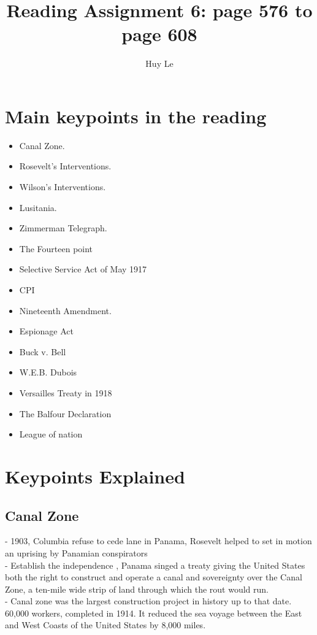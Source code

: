 \documentclass{article}
\begin{document}
\title{Reading Assignment 6: page 576 to page 608}
\author{Huy Le}

\maketitle

\section{Main keypoints in the reading}
\begin{itemize}
\item Canal Zone.
\item Rosevelt's Interventions.
\item Wilson's Interventions.
\item Lusitania.
\item Zimmerman Telegraph.
\item The Fourteen point
\item Selective Service Act of May 1917
\item CPI
\item Nineteenth Amendment.
\item Espionage Act
\item Buck v. Bell
\item W.E.B. Dubois
\item Versailles Treaty in 1918
\item The Balfour Declaration 
\item League of nation

\end{itemize}


\section{Keypoints Explained}
\subsection{ Canal Zone}
- 1903, Columbia refuse to cede lane in Panama, Rosevelt helped to set in motion an uprising by Panamian conspirators\\
- Establish the independence , Panama singed a treaty giving the United States both the right to construct and operate a canal and sovereignty over the Canal Zone, a ten-mile wide strip of land through which the rout would run.\\
- Canal zone was the largest construction project in history up to that date. 60,000 workers, completed in 1914. It reduced the sea voyage between the East and West Coasts of the United States by 8,000 miles. \\
\end{document}
